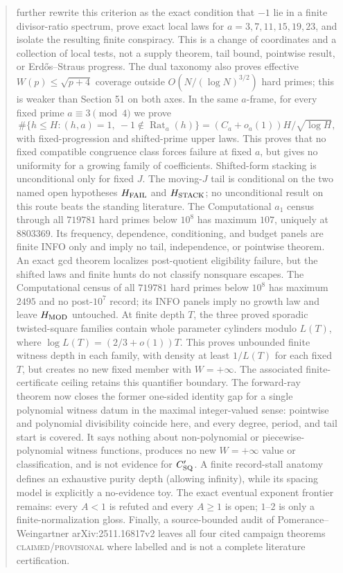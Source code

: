 \documentclass[10pt,reqno]{amsart}
\theoremstyle{definition}
\newcommand{\1}{\mathbf 1}
\begin{document}
\begin{abstract}
further rewrite this criterion as the exact condition that $-1$ lie in a
finite divisor-ratio spectrum, prove exact local laws for
$a=3,7,11,15,19,23$, and isolate the resulting finite conspiracy.  This is
a change of coordinates and a collection of local tests, not a supply
theorem, tail bound, pointwise result, or Erd\H{o}s--Straus progress.
The dual taxonomy also proves effective $W(p)\leq\sqrt{p+4}$ coverage
outside $O(N/(\log N)^{3/2})$ hard primes; this is weaker than Section 51 on
both axes.  In the same $a$-frame, for every fixed prime
$a\equiv3\pmod4$ we prove
\[
 \#\{h\leq H:(h,a)=1,\ -1\notin\operatorname {Rat}_a(h)\}
   =(C_a+o_a(1))H/\sqrt{\log H},
\]
with fixed-progression and shifted-prime upper laws.  This proves that no
fixed compatible congruence class forces failure at fixed $a$, but gives no
uniformity for a growing family of coefficients.  Shifted-form stacking is
unconditional only for fixed $J$.  The moving-$J$ tail is conditional on the
two named open hypotheses $H_{\rm FAIL}$ and $H_{\rm STACK}$; no
unconditional result on this route beats the standing literature.  The
Computational $a_1$ census through all $719781$ hard primes below $10^8$
has maximum $107$, uniquely at $8803369$.  Its frequency, dependence,
conditioning, and budget panels are finite INFO only and imply no tail,
independence, or pointwise theorem.  An exact gcd theorem localizes
post-quotient eligibility failure,
but the shifted laws and finite hunts do not classify nonsquare escapes.
The Computational census of all $719781$ hard primes below $10^8$ has
maximum $2495$ and no post-$10^7$ record; its INFO panels imply no growth
law and leave $H_{\rm MOD}$ untouched.  At finite depth $T$, the three
proved sporadic twisted-square families contain whole parameter cylinders
modulo $L(T)$, where $\log L(T)=(2/3+o(1))T$.  This proves unbounded finite
witness depth in each family, with density at least $1/L(T)$ for each fixed
$T$, but creates no new fixed member with $W=+\infty$.  The associated
finite-certificate ceiling retains this quantifier boundary.  The forward-ray
theorem now closes the former one-sided identity gap for a single polynomial
witness datum in the maximal integer-valued sense: pointwise and polynomial
divisibility coincide here, and every degree, period, and tail start is
covered.  It says nothing about non-polynomial or piecewise-polynomial
witness functions, produces no new $W=+\infty$ value or classification, and
is not evidence for $C_{\rm SQ}'$.  A finite
record-stall anatomy defines an exhaustive purity depth (allowing infinity),
while its spacing model is explicitly a no-evidence toy.  The exact eventual
exponent frontier remains: every $A<1$ is refuted and every $A\geq1$ is
open; $1$--$2$ is only a finite-normalization gloss.  Finally, a
source-bounded audit of Pomerance--Weingartner arXiv:2511.16817v2 leaves all
four cited campaign theorems \textsc{claimed/provisional} where labelled and
is not a complete literature certification.


\end{abstract}
\end{document}

